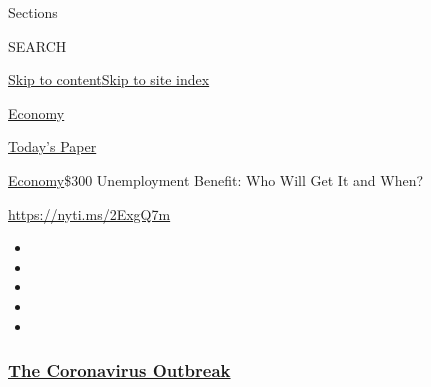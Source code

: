 Sections

SEARCH

\protect\hyperlink{site-content}{Skip to
content}\protect\hyperlink{site-index}{Skip to site index}

\href{https://www.nytimes3xbfgragh.onion/section/business/economy}{Economy}

\href{https://myaccount.nytimes3xbfgragh.onion/auth/login?response_type=cookie\&client_id=vi}{}

\href{https://www.nytimes3xbfgragh.onion/section/todayspaper}{Today's
Paper}

\href{/section/business/economy}{Economy}\textbar{}\$300 Unemployment
Benefit: Who Will Get It and When?

\url{https://nyti.ms/2ExgQ7m}

\begin{itemize}
\item
\item
\item
\item
\item
\end{itemize}

\hypertarget{the-coronavirus-outbreak}{%
\subsubsection{\texorpdfstring{\href{https://www.nytimes3xbfgragh.onion/news-event/coronavirus?name=styln-coronavirus-markets\&region=TOP_BANNER\&block=storyline_menu_recirc\&action=click\&pgtype=Article\&impression_id=411548b0-f4c5-11ea-b924-e5b48aa72b34\&variant=undefined}{The
Coronavirus
Outbreak}}{The Coronavirus Outbreak}}\label{the-coronavirus-outbreak}}

